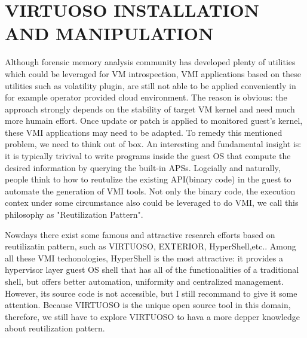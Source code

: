 
\chapter{VIRTUOSO INSTALLATION AND MANIPULATION} %

\label{Chapter8} %


Although forensic memory analysis community has developed plenty of utilities which could be leveraged for VM introspection, 
VMI applications based on these utilities such as volatility plugin, are still not able to be applied conveniently in for example 
operator provided cloud environment. The reason is obvious: the approach strongly depends on the stability of target VM kernel and need much
more humain effort. Once update or patch is applied to monitored guest’s kernel, these VMI applications may need to be adapted. To remedy this 
mentioned problem, we need to think out of box. An interesting and fundamental insight is: it is typically trivival to write programs inside 
the guest OS that compute the desired information by querying the built-in APSs. Logcially and naturally, people think to how to reutulize 
the existing API(binary code) in the guest to automate the generation of VMI tools. Not only the binary code, the execution contex under some
circumstance also could be leveraged to do VMI, we call this philosophy as "Reutilization Pattern". 

Nowdays there exist some famous and attractive research efforts based on reutilizatin pattern, such as VIRTUOSO\cite{Reference27}, 
EXTERIOR\cite{Reference29}, HyperShell\cite{Reference31},etc.. Among all these VMI techonologies, HyperShell is the most attractive: it provides
a hypervisor layer guest OS shell that has all of the functionalities of a traditional shell, but offers better automation, uniformity and 
centralized management. However, its source code is not accessible, but I still recommand to give it some attention.
Because VIRTUOSO is the unique open source tool in this domain, therefore, we still have to  explore VIRTUOSO to hava a more depper
knowledge about reutilization pattern.

